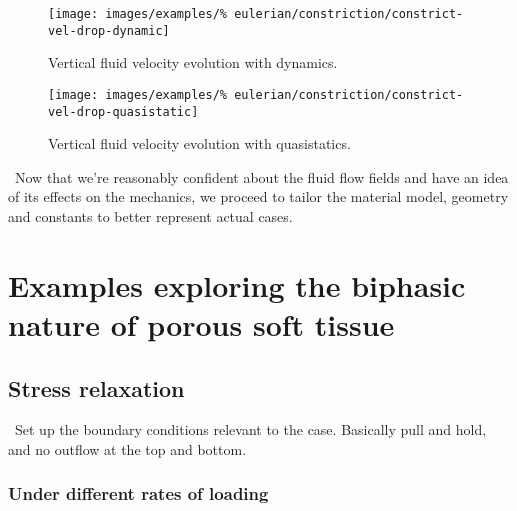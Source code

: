 \begin{figure}[!hptb]
\centering
\texttt{[image: images/examples/\%
eulerian/constriction/constrict-vel-drop-dynamic]}
\caption{Vertical fluid velocity evolution with dynamics.} 
\label{velocity-evolution-dynamic}
\end{figure}

\begin{figure}[!hptb]
\centering
\texttt{[image: images/examples/\%
eulerian/constriction/constrict-vel-drop-quasistatic]}
\caption{Vertical fluid velocity evolution with quasistatics.} 
\label{velocity-evolution-quasistatic}
\end{figure}

\clearpage

\textbullet\ Now that we're reasonably confident about the fluid flow
fields and have an idea of its effects on the mechanics, we proceed to
tailor the material model, geometry and constants to better represent
actual cases.

\section{Examples exploring the biphasic nature of porous soft tissue}
\label{biphasic-examples-2}


\subsection{Stress relaxation}
\label{stress-relaxation}

\textbullet\ Set up the boundary conditions relevant to the
case. Basically pull and hold, and no outflow at the top and
bottom.

\subsubsection{Under different rates of loading}
\label{modifying-load-rates}

